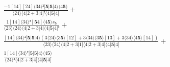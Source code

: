 \documentclass[varwidth, border=5pt]{standalone}
\begin{document}
\begin{my}
$\begin{gathered}
\scriptscriptstyle\frac{-1[14][24]⟨34⟩²[𝟓|𝟓|4⟩⟨4𝟓⟩}{⟨24⟩⟨4|2+3|4]²⟨4|𝟓|4]} +\\
\scriptscriptstyle\frac{1[14]⟨34⟩³[𝟓4]⟨4𝟓⟩s_{𝟓}}{⟨23⟩⟨24⟩⟨4|2+3|4]⟨4|𝟓|4]²} +\\
\scriptscriptstyle\frac{[14]⟨34⟩²[𝟓|𝟓|4⟩(3⟨24⟩⟨3𝟓⟩[12]+3⟨34⟩⟨3𝟓⟩[13]+3⟨34⟩⟨4𝟓⟩[14])}{⟨23⟩⟨24⟩⟨4|2+3|1]⟨4|2+3|4]⟨4|𝟓|4]} +\\
\scriptscriptstyle\frac{1[14]⟨34⟩²[𝟓|𝟓|4⟩⟨4𝟓⟩}{⟨24⟩²⟨4|2+3|4]⟨4|𝟓|4]} \phantom{+}
\end{gathered}$
\end{my}
\end{document}
